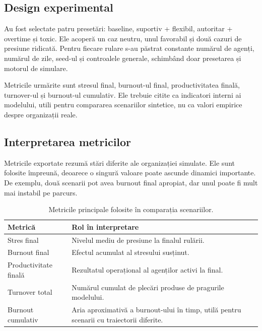 \documentclass[12pt,a4paper]{article}
\begin{document}
\subsection{Design experimental}

Au fost selectate patru presetări: baseline, suportiv + flexibil, autoritar + overtime și toxic. Ele acoperă un caz neutru, unul favorabil și două cazuri de presiune ridicată. Pentru fiecare rulare s-au păstrat constante numărul de agenți, numărul de zile, seed-ul și controalele generale, schimbând doar presetarea și motorul de simulare.

Metricile urmărite sunt stresul final, burnout-ul final, productivitatea finală, turnover-ul și burnout-ul cumulativ. Ele trebuie citite ca indicatori interni ai modelului, utili pentru compararea scenariilor sintetice, nu ca valori empirice despre organizații reale.

\subsection{Interpretarea metricilor}

Metricile exportate rezumă stări diferite ale organizației simulate. Ele sunt folosite împreună, deoarece o singură valoare poate ascunde dinamici importante. De exemplu, două scenarii pot avea burnout final apropiat, dar unul poate fi mult mai instabil pe parcurs.

\begin{table}[H]
    \centering
    \begin{tabular}{>{\raggedright\arraybackslash}p{}>{\raggedright\arraybackslash}p{}}
        \toprule
        Metrică & Rol în interpretare \\
        \midrule
        Stres final & Nivelul mediu de presiune la finalul rulării. \\
        Burnout final & Efectul acumulat al stresului susținut. \\
        Productivitate finală & Rezultatul operațional al agenților activi la final. \\
        Turnover total & Numărul cumulat de plecări produse de pragurile modelului. \\
        Burnout cumulativ & Aria aproximativă a burnout-ului în timp, utilă pentru scenarii cu traiectorii diferite. \\
        \bottomrule
    \end{tabular}
    \caption{Metricile principale folosite în comparația scenariilor.}
\end{table}
\end{document}
